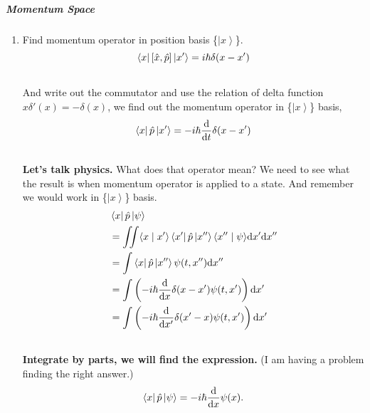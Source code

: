 \documentclass[letterpaper,10pt,english]{sphinxmanual}
\def\d{{\rm d}}
\newcommand{\bra}[1]{\left\langle #1\right|}
\newcommand{\ket}[1]{\left| #1\right\rangle}
\newcommand{\braket}[2]{\langle #1 \mid #2 \rangle}
\begin{document}
\subparagraph{Momentum Space}
\label{QuantumMechanics:id1}\begin{enumerate}
\item {} 
Find momentum operator in position basis \{$\ket{x}$\}.
\begin{gather}
\begin{split}\bra{x} \left[ \hat x, \hat p\right] \ket{x'} = i\hbar \delta(x-x')\end{split}\notag\\\begin{split}\end{split}\notag
\end{gather}
And write out the commutator and use the relation of delta function $x\delta'(x) = -\delta(x)$, we find out the momentum operator in \{$\ket{x}$\} basis,
\begin{gather}
\begin{split}\bra{x}\hat p \ket{x'} = -i\hbar \frac{\d }{\d t} \delta(x-x')\end{split}\notag\\\begin{split}\end{split}\notag
\end{gather}
\textbf{Let's talk physics.} What does that operator mean? We need to see what the result is when momentum operator is applied to a state. And remember we would work in \{$\ket{x}$\} basis.
\begin{gather}
\begin{split}&\bra{x} \hat p \ket{\psi} \\
& =  \iint \braket{x}{x'} \bra{x'} \hat p \ket{x''}\braket{x''}{\psi} \d x' \d x''  \\
& =  \int \bra{x}\hat p \ket{x''}\psi(t,x'') \d x'' \\
& =  \int \left( -i\hbar \frac{\d}{\d x} \delta(x-x') \psi(t,x') \right) \d x' \\
& =  \int \left( -i\hbar \frac{\d}{\d x'} \delta(x'-x) \psi(t,x') \right) \d x'\end{split}\notag\\\begin{split}\end{split}\notag
\end{gather}
\textbf{Integrate by parts, we will find the expression.} (I am having a problem finding the right answer.)
\begin{gather}
\begin{split}\bra{x} \hat p \ket{\psi} = - i\hbar \frac{\d }{\d x}\psi(x) .\end{split}\notag\\\begin{split}\end{split}\notag

\end{gather}
\end{enumerate}
\end{document}
